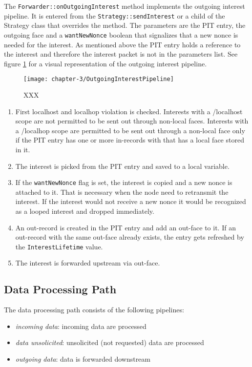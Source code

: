 The \texttt{Forwarder::onOutgoingInterest} method implements the outgoing interest pipeline. It is entered from the \texttt{Strategy::sendInterest} or a child of the Strategy class that overrides the method. The parameters are the PIT entry, the outgoing face and a \texttt{wantNewNonce} boolean that signalizes that a new nonce is needed for the interest. As mentioned above the PIT entry holds a reference to the interest and therefore the interest packet is not in the parameters list. See figure \ref{fig:OutgoingInterestPipeline} for a visual representation of the outgoing interest pipeline.

\begin{figure}[H]
  \centering
  \texttt{[image: chapter-3/OutgoingInterestPipeline]}
  \caption{XXX}
  \label{fig:OutgoingInterestPipeline}
\end{figure}

\begin{enumerate}
\item First localhost and localhop violation is checked. Interests with a /localhost scope are not permitted to be sent out through non-local faces. Interests with a /localhop scope are permitted to be sent out through a non-local face only if the PIT entry has one or more in-records with that has a local face stored in it.
\item The interest is picked from the PIT entry and saved to a local variable.
\item If the \texttt{wantNewNonce} flag is set, the interest is copied and a new nonce is attached to it. That is necessary when the node need to retransmit the interest. If the interest would not receive a new nonce it would be recognized as a looped interest and dropped immediately.
\item An out-record is created in the PIT entry and add an out-face to it. If an out-record with the same out-face already exists, the entry gets refreshed by the \texttt{InterestLifetime} value.
\item The interest is forwarded upstream via out-face.
\end{enumerate}

\subsection{Data Processing Path}

The data processing path consists of the following pipelines:

\begin{itemize}
\item \emph{incoming data}: incoming data are processed
\item \emph{data unsolicited}: unsolicited (not requested) data are processed
\item \emph{outgoing data}: data is forwarded downstream
\end{itemize}

